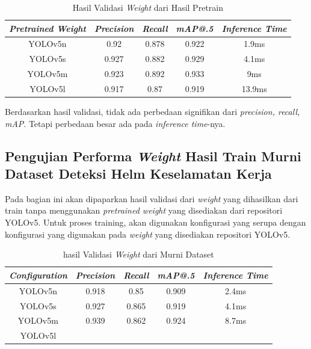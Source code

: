 \begin{longtable}{|c|c|c|c|c|}
  \caption{Hasil Validasi \emph{Weight} dari Hasil Pretrain}
  \label{tb:pretraincoco}\\
  \hline
  \rowcolor[HTML]{C0C0C0}
  \textbf{\emph{Pretrained Weight}} & \emph{Precision}  & \emph{Recall} & \emph{mAP@.5} & \emph{Inference Time}\\
  \hline
  YOLOv5n                           & 0.92               & 0.878         & 0.922         & 1.9ms              \\
  YOLOv5s                           & 0.927              & 0.882         & 0.929         & 4.1ms              \\
  YOLOv5m                           & 0.923              & 0.892         & 0.933        & 9ms                  \\
  YOLOv5l                           & 0.917              & 0.87          & 0.919         & 13.9ms                \\
  \hline
\end{longtable}

Berdasarkan hasil validasi, tidak ada perbedaan signifikan dari \emph{precision, recall, mAP}. Tetapi perbedaan besar ada pada \emph{inference time}-nya. 

\subsection{Pengujian Performa \emph{Weight} Hasil Train Murni Dataset Deteksi Helm Keselamatan Kerja}
\label{subsec:murnidataset}

Pada bagian ini akan dipaparkan hasil validasi dari \emph{weight} yang dihasilkan dari train tanpa menggunakan \emph{pretrained weight} yang disediakan dari repositori YOLOv5. Untuk proses training, akan digunakan konfigurasi yang serupa dengan konfigurasi yang digunakan pada \emph{weight} yang disediakan repositori YOLOv5.

\begin{longtable}{|c|c|c|c|c|}
  \caption{hasil Validasi \emph{Weight} dari Murni Dataset}
  \label{tb:nopretrain}\\
  \hline
  \rowcolor[HTML]{C0C0C0}
  \textbf{\emph{Configuration}} & \emph{Precision}  & \emph{Recall} & \emph{mAP@.5} & \emph{Inference Time}\\
  \hline
  YOLOv5n                           & 0.918              & 0.85         & 0.909         & 2.4ms                \\
  YOLOv5s                           & 0.927             & 0.865        & 0.919        & 4.1ms               \\
  YOLOv5m                           & 0.939            & 0.862        & 0.924        & 8.7ms                \\
  YOLOv5l                           &                   &             &               &                \\
  \hline
\end{longtable}

